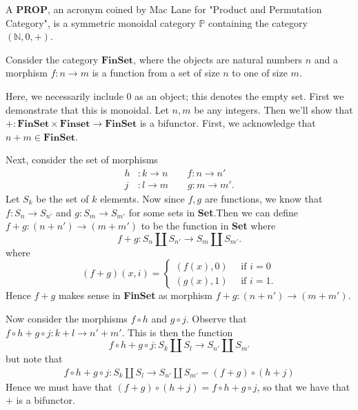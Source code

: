 \begin{definition}
    A \textbf{PROP}, an acronym coined by Mac Lane 
    for "Product and Permutation Category", 
    is a symmetric monoidal category $\mathbb{P}$ containing 
    the category $(\mathbb{N}, 0, +)$. 
\end{definition}

\begin{example}
    Consider the category $\textbf{FinSet}$, where the objects 
    are natural numbers $n$ and a morphism $f: n \to m$ is a function 
    from a set of size $n$ to one of size $m$. 

    Here, we necessarily include $0$ as an object; this denotes the empty set. 
    First we demonstrate that this is monoidal. 
    Let $n, m$ be any integers. Then we'll show that $+: \textbf{FinSet}\times\textbf{Finset} \to \textbf{FinSet}$ 
    is a bifunctor. First, we acknowledge that $n + m \in \textbf{FinSet}$. 

    Next, consider the set of morphisms
    \begin{align*}
        h&: k \to n \qquad f: n \to n'\\
        j&: l \to m \qquad g: m \to m'.
    \end{align*}
    Let $S_k$ be the set of $k$ elements. Now since $f, g$ are functions, 
    we know that $f: S_n \to S_{n'}$ and $g: S_m \to S_{m'}$ for some sets in 
    \textbf{Set}.Then we can define $f + g: (n + n') \to (m + m')$ to be the function 
    in \textbf{Set} where 
    \[
        f + g: S_n \amalg S_{n'} \to S_m \amalg S_{m'}.
    \]
    where 
    \[
        (f + g)(x, i) = 
        \begin{cases}
            (f(x), 0) \quad \text{ if } i = 0\\
            (g(x), 1) \quad \text{ if } i = 1.
        \end{cases}
    \]
    Hence $f + g$ makes sense in \textbf{FinSet} as morphism $f + g: (n + n') \to (m + m')$. 

    Now consider the morphisms $f \circ h$ and $g \circ j$. Observe that 
    $f\circ h + g \circ j : k + l \to n' + m'$. This is then the function 
    \[
        f\circ h + g \circ j: S_k \amalg S_{l} \to S_{n'} \amalg S_{m'}
    \]
    but note that 
    \begin{align*}
        f\circ h + g \circ j: S_k \amalg S_{l} \to S_{n'} \amalg S_{m'}
        =   
        (f + g)\circ(h + j)
    \end{align*}
    Hence we must have that $(f + g)\circ(h + j) = f\circ h + g \circ j$, so that 
    we have that $+$ is a bifunctor. 


\end{example}
